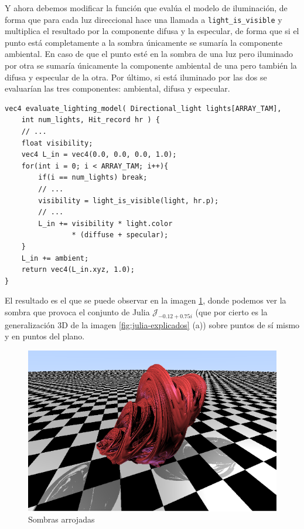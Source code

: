 Y ahora debemos modificar la función que evalúa el modelo de iluminación, de forma que para cada luz direccional hace una llamada a \verb|light_is_visible| y multiplica el resultado por la componente difusa y la especular, de forma que si el punto está completamente a la sombra únicamente se sumaría la componente ambiental. En caso de que el punto esté en la sombra de una luz pero iluminado por otra se sumaría únicamente la componente ambiental de una pero también la difusa y especular de la otra. Por último, si está iluminado por las dos se evaluarían las tres componentes: ambiental, difusa y especular. 

\begin{lstlisting}
vec4 evaluate_lighting_model( Directional_light lights[ARRAY_TAM], 
    int num_lights, Hit_record hr ) {
    // ... 
    float visibility;
    vec4 L_in = vec4(0.0, 0.0, 0.0, 1.0);
    for(int i = 0; i < ARRAY_TAM; i++){
        if(i == num_lights) break;
        // ... 
        visibility = light_is_visible(light, hr.p);
        // ... 
        L_in += visibility * light.color 
                * (diffuse + specular);
    }
    L_in += ambient;
    return vec4(L_in.xyz, 1.0);
}
\end{lstlisting}

El resultado es el que se puede observar en la imagen \ref{fig:sombra-sin-suavizado}, donde podemos ver la sombra que provoca el conjunto de Julia $\mathcal{J}_{-0.12+0.75i}$ (que por cierto es la generalización 3D de la imagen \ref{fig:julia-explicados} (a)) sobre puntos de sí mismo y en puntos del plano.

\begin{figure} [ht]
    \centering
    \includegraphics[scale = 0.45]{img/C8/sombra-1.png}
    \caption{Sombras arrojadas}
    \label{fig:sombra-sin-suavizado}
\end{figure}

